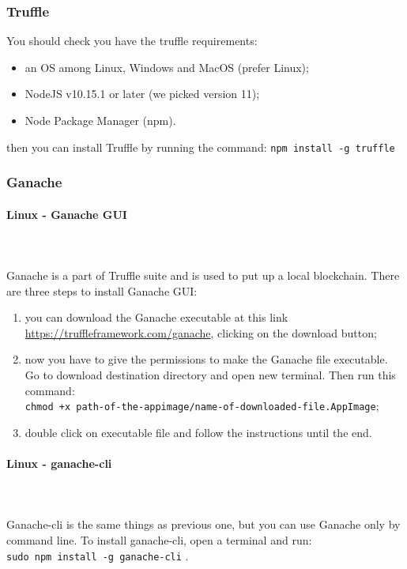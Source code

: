 \subsubsection{Truffle}
You should check you have the truffle requirements:
\begin{itemize}
	\item an OS among Linux, Windows and MacOS (prefer Linux);
	\item NodeJS v10.15.1 or later (we picked version 11);
	\item Node Package Manager (npm\glo).
\end{itemize}
then you can install Truffle by running the command: \texttt{npm install -g truffle}


\subsubsection{Ganache}
\paragraph{Linux - Ganache GUI} \mbox{} \\ \mbox{} \\
Ganache is a part of Truffle suite and is used to put up a local blockchain.
There are three steps to install Ganache GUI:
\begin{enumerate}
	\item you can download the Ganache executable at this link \url{https://truffleframework.com/ganache}, clicking on the download button;
	\item now you have to give the permissions to make the Ganache file executable. Go to download destination directory and open new terminal. Then run this command: \\\texttt{chmod +x path-of-the-appimage/name-of-downloaded-file.AppImage};
	\item double click on executable file and follow the instructions until the end.
\end{enumerate}
\paragraph{Linux - ganache-cli} \mbox{} \\ \mbox{} \\
Ganache-cli is the same things as previous one, but you can use Ganache only by command line.
To install ganache-cli, open a terminal and run: \\ \texttt{sudo npm install -g ganache-cli} .
